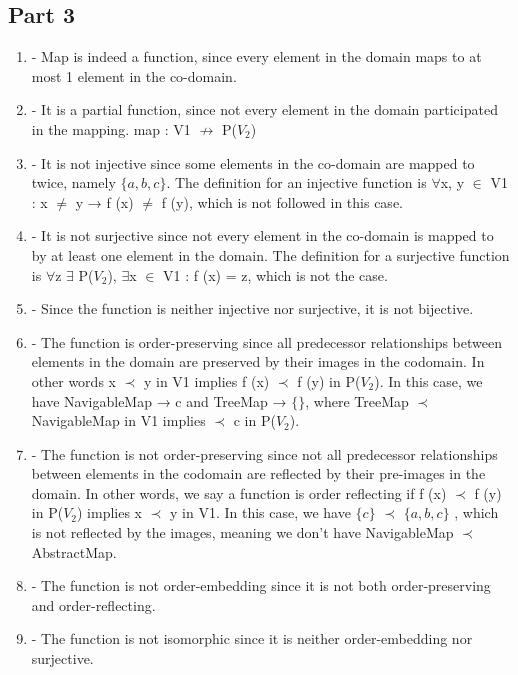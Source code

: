 \documentclass[12pt]{article}
\begin{document}
\subsection*{Part 3}
\begin{enumerate}
	\item - Map is indeed a function, since every element in the domain maps to at most 1 element in the co-domain.
	
	\item - It is a partial function, since not every element in the domain participated in the mapping. 		map : V1 $\not\rightarrow$ P(\(V_2\))
	
	\item - It is not injective since some elements in the co-domain are mapped to twice, namely $\{a ,b ,c\}$. The definition for an injective function is $\forall$x, y $\in$ V1 : x $\neq$ y → f (x) $\neq$ f (y), which is not followed in this case.
	
	\item - It is not surjective since not every element in the co-domain is mapped to by at least one element in the domain. The definition for a surjective function is $\forall$z $\exists$ P(\(V_2\)), $\exists$x $\in$ V1 : f (x) = z, which is not the case.
	
	\item - Since the function is neither injective nor surjective, it is not bijective.
	
	\item -  The function is order-preserving since all predecessor relationships between elements in the domain are preserved by their images in the codomain. In other words 
	x $\prec$ y in V1 implies f (x) $\prec$ f (y) in P(\(V_2\)). In this case, we have NavigableMap → {c} and TreeMap → $\{\}$, where TreeMap $\prec$ NavigableMap in V1 implies {} $\prec$ {c} in P(\(V_2\)).
	
	\item - The function is not order-preserving since not all predecessor relationships between elements in the codomain are reflected by their pre-images in the domain. In other words, we say a function is order reflecting if f (x) $\prec$ f (y) in P(\(V_2\)) implies x $\prec$ y in V1. In this case, we have $\{c\}$ $\prec$ $\{a,b,c\}$ , which is not reflected by the images, meaning we don’t have NavigableMap $\prec$ AbstractMap.
	
	\item - The function is not order-embedding since it is not both order-preserving and order-reflecting.
	
	\item -  The function is not isomorphic since it is neither order-embedding nor surjective.
\end{enumerate}
\end{document}
